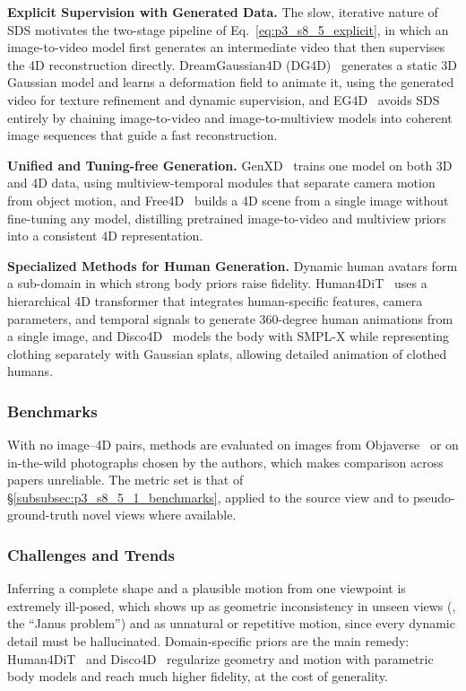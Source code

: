\textbf{Explicit Supervision with Generated Data.} The slow, iterative nature of SDS motivates the two-stage pipeline of Eq.~\eqref{eq:p3_s8_5_explicit}, in which an image-to-video model first generates an intermediate video that then supervises the 4D reconstruction directly. DreamGaussian4D (DG4D)~\cite{ren2023dreamgaussian4d} generates a static 3D Gaussian model and learns a deformation field to animate it, using the generated video for texture refinement and dynamic supervision, and EG4D~\cite{sun2024eg4d} avoids SDS entirely by chaining image-to-video and image-to-multiview models into coherent image sequences that guide a fast reconstruction.

\textbf{Unified and Tuning-free Generation.} GenXD~\cite{zhao2024genxd} trains one model on both 3D and 4D data, using multiview-temporal modules that separate camera motion from object motion, and Free4D~\cite{liu2025free4d} builds a 4D scene from a single image without fine-tuning any model, distilling pretrained image-to-video and multiview priors into a consistent 4D representation.

\textbf{Specialized Methods for Human Generation.} Dynamic human avatars form a sub-domain in which strong body priors raise fidelity. Human4DiT~\cite{shao2024360} uses a hierarchical 4D transformer that integrates human-specific features, camera parameters, and temporal signals to generate 360-degree human animations from a single image, and Disco4D~\cite{pang2025disco4d} models the body with SMPL-X while representing clothing separately with Gaussian splats, allowing detailed animation of clothed humans.



\subsubsection{Benchmarks}
\label{subsubsec:p3_s8_5_2_benchmarks}
With no image--4D pairs, methods are evaluated on images from Objaverse~\cite{deitke2023objaverse} or on in-the-wild photographs chosen by the authors, which makes comparison across papers unreliable. The metric set is that of §\ref{subsubsec:p3_s8_5_1_benchmarks}, applied to the source view and to pseudo-ground-truth novel views where available.

\subsubsection{Challenges and Trends}
\label{subsubsec:p3_s8_5_2_challenges}
Inferring a complete shape and a plausible motion from one viewpoint is extremely ill-posed, which shows up as geometric inconsistency in unseen views (\eg, the ``Janus problem'') and as unnatural or repetitive motion, since every dynamic detail must be hallucinated.
Domain-specific priors are the main remedy: Human4DiT~\cite{shao2024360} and Disco4D~\cite{pang2025disco4d} regularize geometry and motion with parametric body models and reach much higher fidelity, at the cost of generality.


